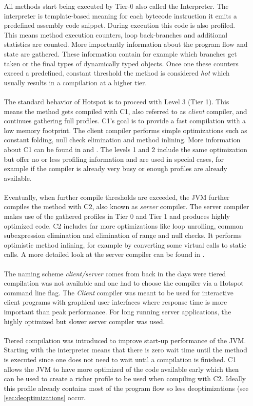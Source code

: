 All methods start being executed by Tier-0 also called the Interpreter.
The interpreter is template-based meaning for each bytecode instruction it emits a predefined assembly code snippet.
During execution this code is also profiled. This means method execution counters, loop back-branches and additional statistics are counted. More importantly information about the program flow and state are gathered. These information contain for example which branches get taken or the final types of dynamically typed objects. Once one these counters exceed a predefined, constant threshold the method is considered \textit{hot} which usually results in a compilation at a higher tier.
\\\\
The standard behavior of Hotspot is to proceed with Level 3 (Tier 1). This means the method gets compiled with C1, also referred to as \textit{client} compiler, and continues gathering full profiles.
C1's goal is to provide a fast compilation with a low memory footprint.
The client compiler performs simple optimizations such as constant folding, null check elimination and method inlining.
More information about C1 can be found in \cite{client_compiler_talk} and \cite{client_compiler}.
The levels 1 and 2 include the same optimization but offer no or less profiling information and are used in special cases, for example if the compiler is already very busy or enough profiles are already available.
\\\\
Eventually, when further compile thresholds are exceeded, the JVM further compiles the method with C2, also known as \textit{server} compiler.
The server compiler makes use of the gathered profiles in Tier 0 and Tier 1 and produces highly optimized code. C2 includes far more optimizations like loop unrolling, common subexpression elimination and elimination of range and null checks. It performs optimistic method inlining, for example by converting some virtual calls to static calls.
A more detailed look at the server compiler can be found in \cite{server_compiler}.
\\\\
The naming scheme \textit{client/server} comes from back in the days were tiered compilation was not available and one had to choose the compiler via a Hotspot command line flag. The \textit{Client} compiler was meant to be used for interactive client programs with graphical user interfaces where response time is more important than peak performance. For long running server applications, the highly optimized but slower server compiler was used. 
\\\\
Tiered compilation was introduced to improve start-up performance of the JVM.
Starting with the interpreter means that there is zero wait time until the method is executed since one does not need to wait until a compilation is finished. C1 allows the JVM to have more optimized of the code available early which then can be used to create a richer profile to be used when compiling with C2. Ideally this profile already contains most of the program flow so less deoptimizations (see \ref{sec:deoptimizations} occur.

